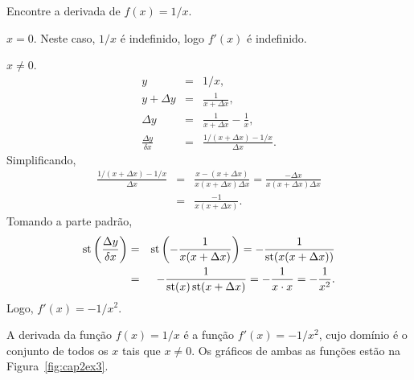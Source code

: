 
\begin{example}
Encontre a derivada de $f(x) = 1/x.$
\begin{caseanalysis}
\item $x = 0$. Neste caso, $1/x$ é indefinido, logo $f'(x)$ é indefinido.
\item $x \ne 0$.
      \begin{eqnarray*}
        y & = & 1/x, \\
        y+\Delta{y} & = & \frac{1}{x + \Delta{x}}, \\
        \Delta{y} & = & \frac{1}{x + \Delta{x}} - \frac{1}{x}, \\
        \frac{\Delta{y}}{\delta{x}} & = &
          \frac{1/(x + \Delta{x}) - 1/x}{\Delta{x}}.
      \end{eqnarray*}
      Simplificando,
      \begin{eqnarray*}
        \frac{1/(x + \Delta{x}) - 1/x}{\Delta{x}} & = &
          \frac{x-(x+\Delta{x})}{x(x+\Delta{x})\Delta{x}} =
            \frac{-\Delta{x}}{x(x+\Delta{x})\Delta{x}} \\
        & = & \frac{-1}{x(x+\Delta{x})}.
      \end{eqnarray*}
      Tomando a parte padrão,
      \begin{eqnarray*}
        \operatorname{st}\left(\frac{\Delta{y}}{\delta{x}}\right) & = &
          \operatorname{st}\left(-\frac{1}{x(x+\Delta{x})}\right) =
            -\frac{1}{\operatorname{st}(x(x+\Delta{x}))} \\
        & = &
          -\frac{1}{\operatorname{st}(x)\operatorname{st}(x+\Delta{x})} =
            -\frac{1}{x \cdot x} =
            -\frac{1}{x^2} .
      \end{eqnarray*}
      Logo, $f'(x) = -1/x^2.$
\end{caseanalysis}
A derivada da função $f(x) = 1/x$ é a função $f'(x) = -1/x^2$, cujo
domínio é o conjunto de todos os $x$ tais que $x \ne 0$. Os gráficos
de ambas as funções estão na Figura~\ref{fig:cap2ex3}.
\end{example}



